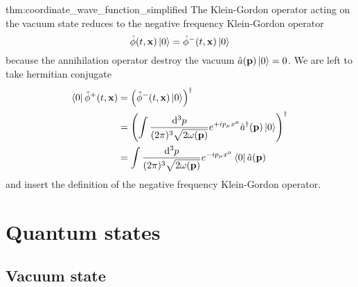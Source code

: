 \begin{delayedproof}{thm:coordinate_wave_function_simplified}
	The Klein-Gordon operator acting on the vacuum state reduces to the negative frequency Klein-Gordon operator
	\begin{equation*}
		\hat\phi(t,\vb{x})
		\ket{0}
		=
		\hat\phi^-(t,\vb{x})
		\ket{0}
	\end{equation*}
	because the annihilation operator destroy the vacuum $\hat{a}(\vb{p})\ket{0}=0$.
	We are left to take hermitian conjugate
	\begin{equation*}
		\begin{split}
			\bra{0}
			\hat\phi^+(t,\vb{x})
			&=
			\left(
				\hat\phi^-(t,\vb{x})
				\ket{0}
			\right)^\dagger
			\\
			&=
			\left(
				\int\frac{\dd[3]{p}}{(2\pi)^3\sqrt{2\omega(\vb{p})}}
				e^{+ip_\mu x^\mu}
				\hat{a}^\dagger(\vb{p})
				\ket{0}
			\right)^\dagger
			\\
			&=
			\int\frac{\dd[3]{p}}{(2\pi)^3\sqrt{2\omega(\vb{p})}}
			e^{-ip_\mu x^\mu}
			\bra{0}
			\hat{a}(\vb{p})
		\end{split}
	\end{equation*}
	and insert the definition of the negative frequency Klein-Gordon operator.
\end{delayedproof}

\section{Quantum states}

\subsection{Vacuum state}

